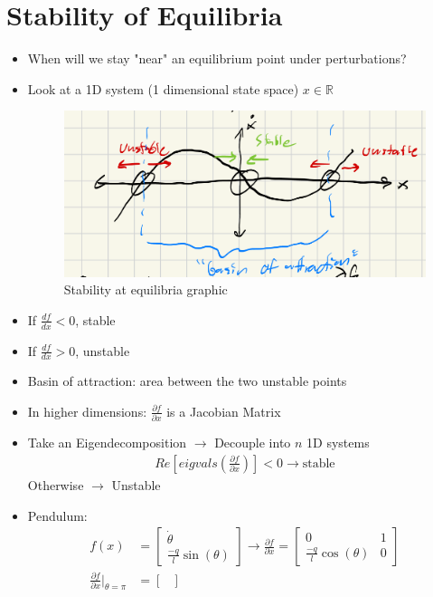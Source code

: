\documentclass[11pt]{article}
\begin{document}
\section{Stability of Equilibria}
\begin{itemize}
    \item When will we stay "near" an equilibrium point under perturbations?
    \item Look at a 1D system (1 dimensional state space) $x\in \mathbb{R}$
    \begin{figure}[H]
        \centering
        \includegraphics[width=0.5\linewidth]{lecture_2_3.png}
        \caption{Stability at equilibria graphic}
        \label{plot3}
    \end{figure}
    \item If $\frac{df}{dx}<0$, stable
    \item If $\frac{df}{dx}>0$, unstable
    \item Basin of attraction: area between the two unstable points
    \item In higher dimensions: $\frac{\partial f}{\partial x}$ is a Jacobian Matrix
    \item Take an Eigendecomposition $\rightarrow$ Decouple into $n$ 1D systems
    \begin{align*}
        Re\left[eigvals\left(\frac{\partial f}{\partial x}\right)\right] < 0 \rightarrow \text{stable}
    \end{align*}
    Otherwise $\rightarrow$ Unstable
    \item Pendulum:
    \begin{align*}
        f(x) &= \begin{bmatrix}
            \dot{\theta} \\
            \frac{-q}{l}\sin(\theta)
        \end{bmatrix}
        \rightarrow
        \frac{\partial f}{\partial x} = \begin{bmatrix}
            0 & 1 \\
            \frac{-q}{l}\cos(\theta) & 0
        \end{bmatrix}
        \\
        \frac{\partial f}{\partial x}|_{\theta=\pi} &= \begin{bmatrix}

\end{bmatrix}
\end{align*}
\end{itemize}
\end{document}
